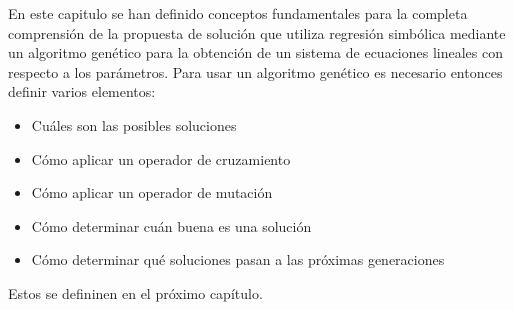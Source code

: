 En este capitulo se han definido conceptos fundamentales para la completa comprensión de la propuesta de solución que utiliza regresión simbólica mediante un algoritmo genético para la obtención de un sistema de ecuaciones lineales con respecto a los parámetros. Para usar un algoritmo genético es necesario entonces definir varios elementos:

\begin{itemize}
    \item Cuáles son las posibles soluciones
    \item Cómo aplicar un operador de cruzamiento
    \item Cómo aplicar un operador de mutación
    \item Cómo determinar cuán buena es una solución
    \item Cómo determinar qué soluciones pasan a las próximas generaciones
\end{itemize}

Estos se defininen en el próximo capítulo.
